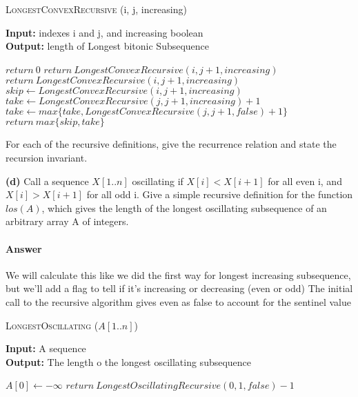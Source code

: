 \documentclass{article}
\begin{document}
\begin{algorithm} \caption{\textsc{LongestConvexRecursive} (i, j, increasing)}\label{alg:seb}
    {\bf Input:} indexes i and j, and increasing boolean\\
    {\bf Output:} length of Longest bitonic Subsequence
    \begin{algorithmic}[1]
            \State$return\ 0$
                \State$return\ LongestConvexRecursive(i, j+1, increasing)$
            \EndIf{}
        \Else{}
                \State$return\ LongestConvexRecursive(i, j+1, increasing)$
            \EndIf{}
        \EndIf{}
        \State$skip \gets LongestConvexRecursive(i, j+1, increasing)$
        \State$take \gets LongestConvexRecursive(j, j+1, increasing) +1$
            \State$take \gets max\{take, LongestConvexRecursive(j, j+1, false) +1\}$
        \EndIf{}
        \State$return\ max\{skip, take\}$
    \end{algorithmic}
\end{algorithm}
\todo{}



For each of the recursive definitions, give the recurrence
relation and state the recursion invariant.

{\bf (d)} Call a sequence $X[1.. n]$ oscillating if $X[i] < X[i + 1]$ for all even i, and
$X[i] > X[i + 1]$ for all odd i. Give a simple recursive definition for
the function $los(A)$, which gives the length of the longest oscillating
subsequence of an arbitrary array A of integers.

\paragraph{Answer}

We will calculate this like we did the first way for longest increasing subsequence, but we'll add a
flag to tell if it's increasing or decreasing (even or odd)
The initial call to the recursive algorithm gives even as false to account for the sentinel value

\begin{algorithm} \caption{\textsc{LongestOscillating} ($A[1..n]$)}\label{alg:seb}
    {\bf Input:} A sequence\\
    {\bf Output:} The length o the longest oscillating subsequence
    \begin{algorithmic}[1]
        \State$A[0] \gets - \infty$
        \State$return\ LongestOscillatingRecursive(0, 1, false) -1$
    \end{algorithmic}
\end{algorithm}
\end{document}
